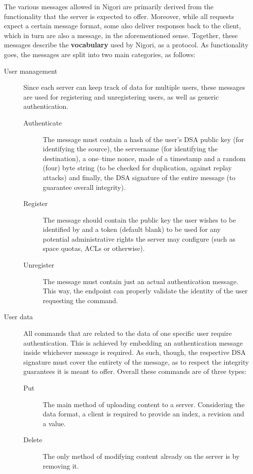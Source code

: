 The various messages allowed in Nigori are primarily derived from the functionality that the server is expected to offer.
Moreover, while all requests expect a certain message format, some also deliver responses back to the client, which in turn are also a message, in the aforementioned sense.
Together, these messages describe the \textbf{vocabulary} used by Nigori, as a protocol.
As functionality goes, the messages are split into two main categories, as follows:
\begin{description}
  \item[User management] Since each server can keep track of data for multiple users, these messages are used for registering and unregistering users, as well as generic authentication.
  \begin{description}
    \item[Authenticate] The message must contain a hash of the user's DSA public key (for identifying the source), the servername (for identifying the destination), a one--time nonce, made of a timestamp and a random (four) byte string (to be checked for duplication, against replay attacks) and finally, the DSA signature of the entire message (to guarantee overall integrity).
    \item[Register] The message should contain the public key the user wishes to be identified by and a token (default blank) to be used for any potential administrative rights the server may configure (such as space quotas, ACLs or otherwise).
    \item[Unregister] The message must contain just an actual authentication message.
    This way, the endpoint can properly validate the identity of the user requesting the command.
  \end{description}
  \item[User data] All commands that are related to the data of one specific user require authentication.
  This is achieved by embedding an authentication message inside whichever message is required.
  As such, though, the respective DSA signature must cover the entirety of the message, as to respect the integrity guarantees it is meant to offer.
  Overall these commands are of three types:
  \begin{description}
    \item[Put] The main method of uploading content to a server.
    Considering the data format, a client is required to provide an index, a revision and a value.
    \item[Delete] The only method of modifying content already on the server is by removing it.

\end{description}
\end{description}
